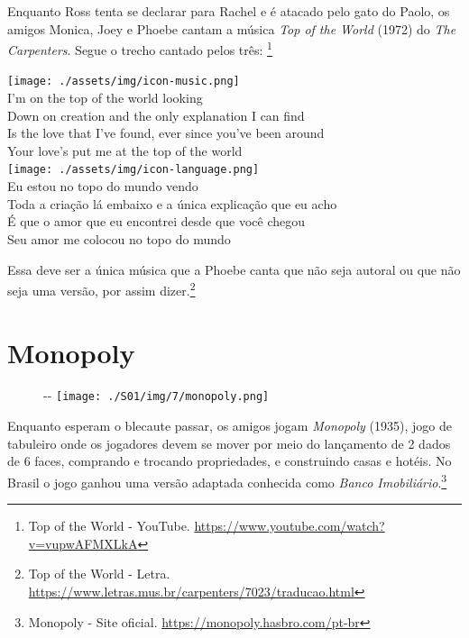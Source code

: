 Enquanto Ross tenta se declarar para Rachel e é atacado pelo gato do
Paolo, os amigos Monica, Joey e Phoebe cantam a música \emph{Top of the
World} (1972) do \emph{The Carpenters}. Segue o trecho cantado pelos
três: \footnote{\sloppy Top of the World - YouTube. \url{https://www.youtube.com/watch?v=vupwAFMXLkA}}

\bigskip
\begin{tcolorbox}[enhanced,
    drop fuzzy shadow southeast, boxrule=0.3pt,
    lower separated=false, sidebyside, sidebyside align=top,
    halign=flush right, halign lower=left, breakable,
    colframe=black!30!dialogoBorder,colback=musicaBg]
\texttt{[image: ./assets/img/icon-music.png]}\\
I’m on the top of the world looking\\Down on creation and the only explanation I can find\\Is the love that I’ve found, ever since you’ve been around\\Your love’s put me at the top of the world\\
\tcblower
\texttt{[image: ./assets/img/icon-language.png]}\\
Eu estou no topo do mundo vendo\\Toda a criação lá embaixo e a única explicação que eu acho\\É que o amor que eu encontrei desde que você chegou\\Seu amor me colocou no topo do mundo\\
\end{tcolorbox}

Essa deve ser a única música que a Phoebe canta que não seja autoral ou
que não seja uma versão, por assim dizer.\footnote{\sloppy Top of the World - Letra. \url{https://www.letras.mus.br/carpenters/7023/traducao.html}}

\hypertarget{monopoly}{%
\section{Monopoly}\label{monopoly}}

\begin{figure}[!ht]
  \begin{adjustwidth}{-\oddsidemargin-1in}{-\rightmargin}
    \centering
    \texttt{[image: ./S01/img/7/monopoly.png]}
  \end{adjustwidth}
\end{figure}

Enquanto esperam o blecaute passar, os amigos jogam \emph{Monopoly}
(1935), jogo de tabuleiro onde os jogadores devem se mover por meio do
lançamento de 2 dados de 6 faces, comprando e trocando propriedades, e
construindo casas e hotéis. No Brasil o jogo ganhou uma versão adaptada
conhecida como \emph{Banco Imobiliário}.\footnote{\sloppy Monopoly - Site oficial. \url{https://monopoly.hasbro.com/pt-br}}
